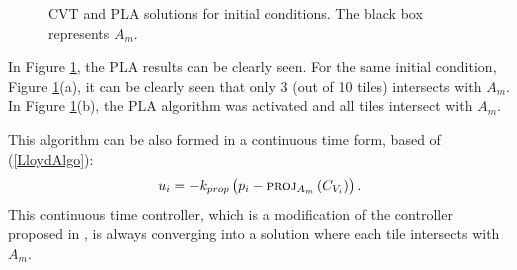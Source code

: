 \documentclass{iacas}
\begin{document}
\begin{figure}
	\captionsetup[subfigure]{position=b}
	\centering
	\caption{CVT and PLA solutions for initial conditions. The black box represents $A_m$.}
\label{fig:projected lloyds algorithm}
\end{figure}

In Figure \ref{fig:projected lloyds algorithm}, the PLA results can be clearly seen. For the same initial condition, Figure \ref{fig:projected lloyds algorithm}(a), it can be clearly seen that only 3 (out of 10 tiles) intersects with $A_m$. In Figure \ref{fig:projected lloyds algorithm}(b), the PLA algorithm was activated and all tiles intersect with $A_m$.

This algorithm can be also formed in a continuous time form, based of (\ref{LloydAlgo}): %
\begin{equation} \label{ProjectedLloydsContol}
u_{i} = -k_{prop}\left( p_i - \textsc{proj}_{A_m}\left( C_{V_{i}} \right) \right).
\end{equation}
This continuous time controller, which is a modification of the controller proposed in \cite{Cortes2004}, is always converging into a solution where each tile intersects with $A_m$.
\end{document}
